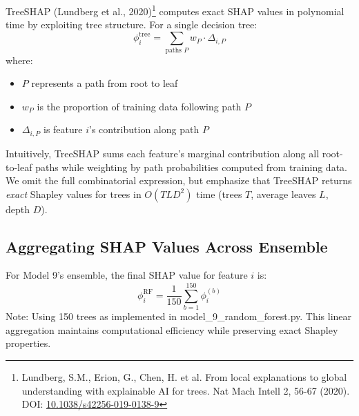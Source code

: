 TreeSHAP (Lundberg et al., 2020)\footnote{Lundberg, S.M., Erion, G., Chen, H. et al. From local explanations to global understanding with explainable AI for trees. Nat Mach Intell 2, 56-67 (2020). DOI: \href{https://doi.org/10.1038/s42256-019-0138-9}{10.1038/s42256-019-0138-9}} computes exact SHAP values in polynomial time by exploiting tree structure. For a single decision tree:
%
\begin{equation}
\phi_i^{\text{tree}} = \sum_{\text{paths } P} w_P \cdot \Delta_{i,P}
\label{eq:treeshap_path}
\end{equation}
%
where:
\begin{itemize}
    \item $P$ represents a path from root to leaf
    \item $w_P$ is the proportion of training data following path $P$
    \item $\Delta_{i,P}$ is feature $i$'s contribution along path $P$
\end{itemize}

Intuitively, TreeSHAP sums each feature's marginal contribution along all root-to-leaf paths while weighting by path probabilities computed from training data. We omit the full combinatorial expression, but emphasize that TreeSHAP returns \emph{exact} Shapley values for trees in $O(TLD^2)$ time (trees $T$, average leaves $L$, depth $D$).

\subsection{Aggregating SHAP Values Across Ensemble}
For Model 9's ensemble, the final SHAP value for feature $i$ is:
%
\begin{equation}
\phi_i^{\text{RF}} = \frac{1}{150} \sum_{b=1}^{150} \phi_i^{(b)}
\label{eq:rf_shap}
\end{equation}
%
Note: Using 150 trees as implemented in  {\ttfamily model\_9\_random\_forest.py}. This linear aggregation maintains computational efficiency while preserving exact Shapley properties.

